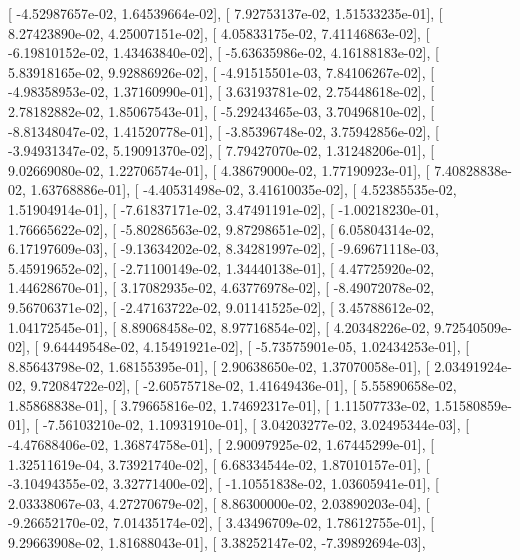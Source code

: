 \documentclass{article}
\begin{document}
       [ -4.52987657e-02,   1.64539664e-02],
       [  7.92753137e-02,   1.51533235e-01],
       [  8.27423890e-02,   4.25007151e-02],
       [  4.05833175e-02,   7.41146863e-02],
       [ -6.19810152e-02,   1.43463840e-02],
       [ -5.63635986e-02,   4.16188183e-02],
       [  5.83918165e-02,   9.92886926e-02],
       [ -4.91515501e-03,   7.84106267e-02],
       [ -4.98358953e-02,   1.37160990e-01],
       [  3.63193781e-02,   2.75448618e-02],
       [  2.78182882e-02,   1.85067543e-01],
       [ -5.29243465e-03,   3.70496810e-02],
       [ -8.81348047e-02,   1.41520778e-01],
       [ -3.85396748e-02,   3.75942856e-02],
       [ -3.94931347e-02,   5.19091370e-02],
       [  7.79427070e-02,   1.31248206e-01],
       [  9.02669080e-02,   1.22706574e-01],
       [  4.38679000e-02,   1.77190923e-01],
       [  7.40828838e-02,   1.63768886e-01],
       [ -4.40531498e-02,   3.41610035e-02],
       [  4.52385535e-02,   1.51904914e-01],
       [ -7.61837171e-02,   3.47491191e-02],
       [ -1.00218230e-01,   1.76665622e-02],
       [ -5.80286563e-02,   9.87298651e-02],
       [  6.05804314e-02,   6.17197609e-03],
       [ -9.13634202e-02,   8.34281997e-02],
       [ -9.69671118e-03,   5.45919652e-02],
       [ -2.71100149e-02,   1.34440138e-01],
       [  4.47725920e-02,   1.44628670e-01],
       [  3.17082935e-02,   4.63776978e-02],
       [ -8.49072078e-02,   9.56706371e-02],
       [ -2.47163722e-02,   9.01141525e-02],
       [  3.45788612e-02,   1.04172545e-01],
       [  8.89068458e-02,   8.97716854e-02],
       [  4.20348226e-02,   9.72540509e-02],
       [  9.64449548e-02,   4.15491921e-02],
       [ -5.73575901e-05,   1.02434253e-01],
       [  8.85643798e-02,   1.68155395e-01],
       [  2.90638650e-02,   1.37070058e-01],
       [  2.03491924e-02,   9.72084722e-02],
       [ -2.60575718e-02,   1.41649436e-01],
       [  5.55890658e-02,   1.85868838e-01],
       [  3.79665816e-02,   1.74692317e-01],
       [  1.11507733e-02,   1.51580859e-01],
       [ -7.56103210e-02,   1.10931910e-01],
       [  3.04203277e-02,   3.02495344e-03],
       [ -4.47688406e-02,   1.36874758e-01],
       [  2.90097925e-02,   1.67445299e-01],
       [  1.32511619e-04,   3.73921740e-02],
       [  6.68334544e-02,   1.87010157e-01],
       [ -3.10494355e-02,   3.32771400e-02],
       [ -1.10551838e-02,   1.03605941e-01],
       [  2.03338067e-03,   4.27270679e-02],
       [  8.86300000e-02,   2.03890203e-04],
       [ -9.26652170e-02,   7.01435174e-02],
       [  3.43496709e-02,   1.78612755e-01],
       [  9.29663908e-02,   1.81688043e-01],
       [  3.38252147e-02,  -7.39892694e-03],
\end{document}
